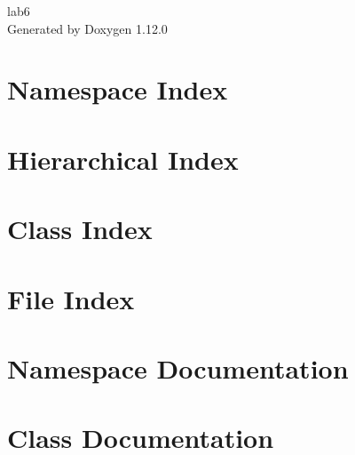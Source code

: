 \documentclass[twoside]{book}
\newcommand{\+}{\discretionary{\mbox{\scriptsize$\hookleftarrow$}}{}{}}
\newcommand{\clearemptydoublepage}{%
    \newpage{\pagestyle{empty}\cleardoublepage}%
  }
\begin{document}
  \raggedbottom
    \hypersetup{pageanchor=false,
                bookmarksnumbered=true,
                pdfencoding=unicode
               }
  \begin{titlepage}
  \vspace*{7cm}
  \begin{center}%
  {\Large lab6}\\
  \vspace*{1cm}
  {\large Generated by Doxygen 1.12.0}\\
  \end{center}
  \end{titlepage}
  \clearemptydoublepage
  \tableofcontents
  \clearemptydoublepage
  \hypersetup{pageanchor=true}

\chapter{Namespace Index}

\chapter{Hierarchical Index}

\chapter{Class Index}

\chapter{File Index}

\chapter{Namespace Documentation}

\chapter{Class Documentation}













\end{document}
